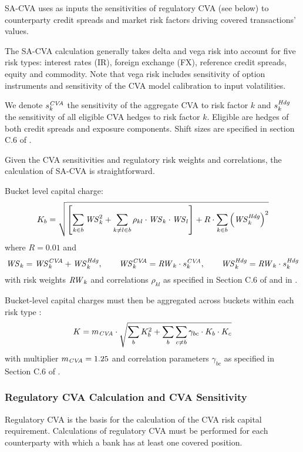 SA-CVA uses as inputs the sensitivities of regulatory CVA (see below) to counterparty credit spreads and market risk factors driving covered transactions' values.

\medskip\noindent
The SA-CVA calculation generally takes delta and vega risk into account for five risk types: interest rates (IR), foreign exchange (FX), reference credit spreads, equity and commodity. Note that vega risk includes sensitivity of option instruments and sensitivity of the CVA model calibration to input volatilities.

\medskip\noindent
We denote $s_k^{\mathit{CVA}}$ the sensitivity of the aggregate CVA to risk factor $k$ and $s_k^{\mathit{Hdg}}$ the sensitivity of all eligible CVA hedges to risk factor $k$. Eligible are hedges of both credit spreads and exposure components. Shift sizes are specified in section C.6 of \cite{d424}.

Given the CVA sensitivities and regulatory risk weights and correlations, the calculation of SA-CVA is straightforward.

\noindent
Bucket level capital charge:
$$
K_b = \sqrt{ \left[\sum_{k\in b} \mathit{WS}_k^2 + \sum_{k\ne l \in b} \rho_{kl} \cdot \mathit{WS}_k \cdot \mathit{WS}_l\right] + R\cdot \sum_{k\in b} \left(\mathit{WS}_k^{\mathit{Hdg}}\right)^2 }
$$
where $R=0.01$ and
$$
\mathit{WS}_k = \mathit{WS}_k^{\mathit{CVA}} + \mathit{WS}_k^{\mathit{Hdg}}, \qquad \mathit{WS}_k^{\mathit{CVA}} = \mathit{RW}_k \cdot s_k^{\mathit{CVA}}, \qquad \mathit{WS}_k^{\mathit{Hdg}} = \mathit{RW}_k \cdot s_k^{\mathit{Hdg}}
$$
with risk weights $\mathit{RW}_k$ and correlations $\rho_{kl}$ as specified in Section C.6 of \cite{d424} and in \cite{d507}.

\medskip\noindent
Bucket-level capital charges must then be aggregated across buckets within each risk type :
$$
K = m_{\mathit{CVA}}\cdot\sqrt{ \sum_b K_b^2 + \sum_b \sum_{c\ne b} \gamma_{bc} \cdot K_b \cdot K_c}
$$
with multiplier $m_{\mathit{CVA}}=1.25$ and correlation parameters $\gamma_{bc}$ as specified in Section C.6 of \cite{d424}.

\subsubsection{Regulatory CVA Calculation and CVA Sensitivity}

Regulatory CVA is the basis for the calculation of the CVA risk capital requirement. 
Calculations of regulatory CVA must be performed for each counterparty with which a bank has at least one covered position.

